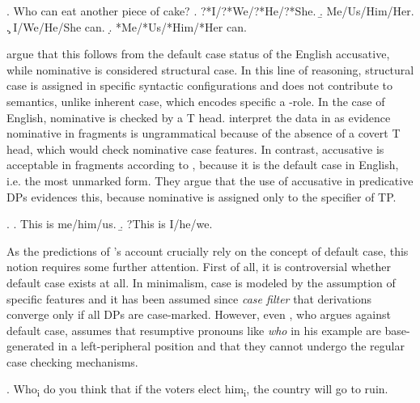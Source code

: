 \ex. Who can eat another piece of cake? \hfill \citep[77]{barton.progovac2005} \label{ex:barton.cake}
\a. ?*I/?*We/?*He/?*She.
\b. Me/Us/Him/Her.
\c. I/We/He/She can.
\d. *Me/*Us/*Him/*Her can.

\citeauthor{barton.progovac2005} argue that this follows from the default case status of the English accusative, while nominative is considered structural case. In this line of reasoning, structural case is assigned in specific syntactic configurations and does not contribute to semantics, unlike inherent case, which encodes specific a \texttheta-role. In the case of English, nominative is checked by a T head. \citet{barton.progovac2005} interpret the data in \Last as evidence nominative in fragments is ungrammatical because of the absence of a covert T head, which would check nominative case features. In contrast, accusative is acceptable in fragments according to \citet[78]{barton.progovac2005}, because it is the default case in English, i.e. the most unmarked form. They argue that the use of accusative in predicative DPs \Next evidences this, because nominative is assigned only to the specifier of TP.

\ex. \a. This is me/him/us.\hfill \citep[79]{barton.progovac2005}
    \b. ?This is I/he/we.

As the predictions of \citeauthor{barton.progovac2005}'s account crucially rely on the concept of default case, this notion requires some further attention. First of all, it is controversial whether default case exists at all. In minimalism, case is modeled by the assumption of specific features and it has been assumed since  \textit{case filter} that derivations converge only if all DPs are case-marked. However, even \citet{merchant2004a}, who argues against default case, assumes that resumptive pronouns like \textit{who} in his example \Next are base-generated in a left-peripheral position and that they cannot undergo the regular case checking mechanisms. 

\ex. Who\textsubscript{i} do you think that if the voters elect him\textsubscript{i}, the country will go to ruin.

